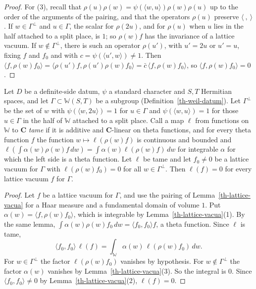 \begin{proof}
For (3), recall that $\rho(u)\rho(w)=\psi(\langle w,u\rangle)\rho(w)\rho(u)$ up
to the order of the arguments of the pairing, and that the operators $\rho(u)$
preserve $\langle\ ,\ \rangle$. If $w\in\Gamma^\perp$ and $u\in\Gamma$, the
scalar for $\rho(2u)$, and for $\rho(u)$ when $u$ lies in the half attached to a
split place, is $1$; so $\rho(w)f$ has the invariance of a lattice vacuum. If
$w\notin\Gamma^\perp$, there is such an operator $\rho(u')$, with
$u'=2u$ or $u'=u$, fixing $f$ and $f_0$ and with
$c=\psi(\langle u',w\rangle)\neq1$. Then
$\langle f,\rho(w)f_0\rangle=\langle\rho(u')f,\rho(u')\rho(w)f_0\rangle
=\bar c\,\langle f,\rho(w)f_0\rangle$, so $\langle f,\rho(w)f_0\rangle=0$.
\end{proof}

\begin{lemma}\label{th-vacuum-irreducibility}
Let $D$ be a definite-side datum, $\psi$ a standard character and $S,T$
Hermitian spaces, and let $\Gamma\subset\mathbb W(S,T)$ be a subgroup
(Definition~\ref{th-weil-datum}). Let $\Gamma^\perp$ be the set of $w$ with
$\psi(\langle w,2u\rangle)=1$ for $u\in\Gamma$ and $\psi(\langle w,u\rangle)=1$
for those $u\in\Gamma$ in the half of $\mathbb W$ attached to a split place.
Call a map $\ell$ from functions on $\mathbb W$ to $\mathbf C$ \emph{tame} if
it is additive and $\mathbf C$-linear on theta functions, and for every theta
function $f$ the function $w\mapsto\ell(\rho(w)f)$ is continuous and bounded
and $\ell(\int\alpha(w)\rho(w)f\,dw)=\int\alpha(w)\ell(\rho(w)f)\,dw$ for
integrable $\alpha$ for which the left side is a theta function. Let $\ell$ be
tame and let $f_0\neq0$ be a lattice vacuum for $\Gamma$ with
$\ell(\rho(w)f_0)=0$ for all $w\in\Gamma^\perp$. Then $\ell(f)=0$ for every
lattice vacuum $f$ for $\Gamma$.
\end{lemma}
\begin{proof}
Let $f$ be a lattice vacuum for $\Gamma$, and use the pairing of
Lemma~\ref{th-lattice-vacua} for a Haar measure and a fundamental domain of
volume $1$. Put $\alpha(w)=\langle f,\rho(w)f_0\rangle$, which is integrable by
Lemma~\ref{th-lattice-vacua}(1). By the same lemma,
$\int\alpha(w)\rho(w)f_0\,dw=\langle f_0,f_0\rangle f$, a theta function. Since
$\ell$ is tame,
\[
\langle f_0,f_0\rangle\,\ell(f)=\int_{\mathbb W}\alpha(w)\,\ell(\rho(w)f_0)\,dw .
\]
For $w\in\Gamma^\perp$ the factor $\ell(\rho(w)f_0)$ vanishes by hypothesis.
For $w\notin\Gamma^\perp$ the factor $\alpha(w)$ vanishes by
Lemma~\ref{th-lattice-vacua}(3). So the integral is $0$. Since
$\langle f_0,f_0\rangle\neq0$ by Lemma~\ref{th-lattice-vacua}(2), $\ell(f)=0$.
\end{proof}

